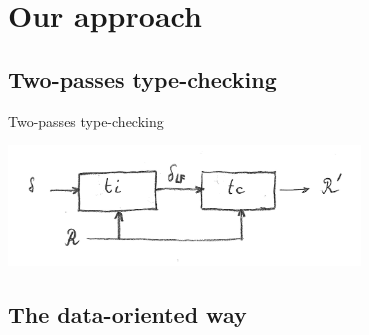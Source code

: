 \documentclass[ignorenonframetext,red]{beamer}
\begin{document}
\section{Our approach}

\subsection{Two-passes type-checking}

\begin{frame}{Two-passes type-checking}

  {\centering\includegraphics[width=0.7\textwidth]{images/tc-delta2.png}\\}
\end{frame}

\subsection{The data-oriented way}
\end{document}
